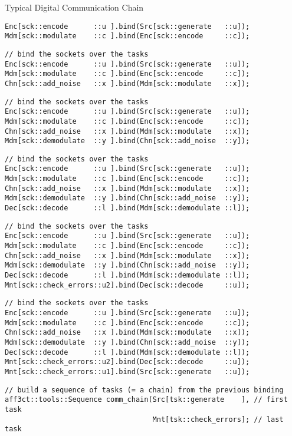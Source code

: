 \begin{frame}{Typical Digital Communication Chain}
\begin{overprint}
\begin{verbatim}
Enc[sck::encode      ::u ].bind(Src[sck::generate   ::u]);
Mdm[sck::modulate    ::c ].bind(Enc[sck::encode     ::c]);
  \end{verbatim}
  \begin{verbatim}
// bind the sockets over the tasks
Enc[sck::encode      ::u ].bind(Src[sck::generate   ::u]);
Mdm[sck::modulate    ::c ].bind(Enc[sck::encode     ::c]);
Chn[sck::add_noise   ::x ].bind(Mdm[sck::modulate   ::x]);
  \end{verbatim}
  \begin{verbatim}
// bind the sockets over the tasks
Enc[sck::encode      ::u ].bind(Src[sck::generate   ::u]);
Mdm[sck::modulate    ::c ].bind(Enc[sck::encode     ::c]);
Chn[sck::add_noise   ::x ].bind(Mdm[sck::modulate   ::x]);
Mdm[sck::demodulate  ::y ].bind(Chn[sck::add_noise  ::y]);
  \end{verbatim}
  \begin{verbatim}
// bind the sockets over the tasks
Enc[sck::encode      ::u ].bind(Src[sck::generate   ::u]);
Mdm[sck::modulate    ::c ].bind(Enc[sck::encode     ::c]);
Chn[sck::add_noise   ::x ].bind(Mdm[sck::modulate   ::x]);
Mdm[sck::demodulate  ::y ].bind(Chn[sck::add_noise  ::y]);
Dec[sck::decode      ::l ].bind(Mdm[sck::demodulate ::l]);
  \end{verbatim}
  \begin{verbatim}
// bind the sockets over the tasks
Enc[sck::encode      ::u ].bind(Src[sck::generate   ::u]);
Mdm[sck::modulate    ::c ].bind(Enc[sck::encode     ::c]);
Chn[sck::add_noise   ::x ].bind(Mdm[sck::modulate   ::x]);
Mdm[sck::demodulate  ::y ].bind(Chn[sck::add_noise  ::y]);
Dec[sck::decode      ::l ].bind(Mdm[sck::demodulate ::l]);
Mnt[sck::check_errors::u2].bind(Dec[sck::decode     ::u]);
  \end{verbatim}
  \begin{verbatim}
// bind the sockets over the tasks
Enc[sck::encode      ::u ].bind(Src[sck::generate   ::u]);
Mdm[sck::modulate    ::c ].bind(Enc[sck::encode     ::c]);
Chn[sck::add_noise   ::x ].bind(Mdm[sck::modulate   ::x]);
Mdm[sck::demodulate  ::y ].bind(Chn[sck::add_noise  ::y]);
Dec[sck::decode      ::l ].bind(Mdm[sck::demodulate ::l]);
Mnt[sck::check_errors::u2].bind(Dec[sck::decode     ::u]);
Mnt[sck::check_errors::u1].bind(Src[sck::generate   ::u]);
  \end{verbatim}
  \begin{verbatim}
// build a sequence of tasks (= a chain) from the previous binding
aff3ct::tools::Sequence comm_chain(Src[tsk::generate    ], // first task
                                   Mnt[tsk::check_errors]; // last task


\end{verbatim}
\end{overprint}
\end{frame}
